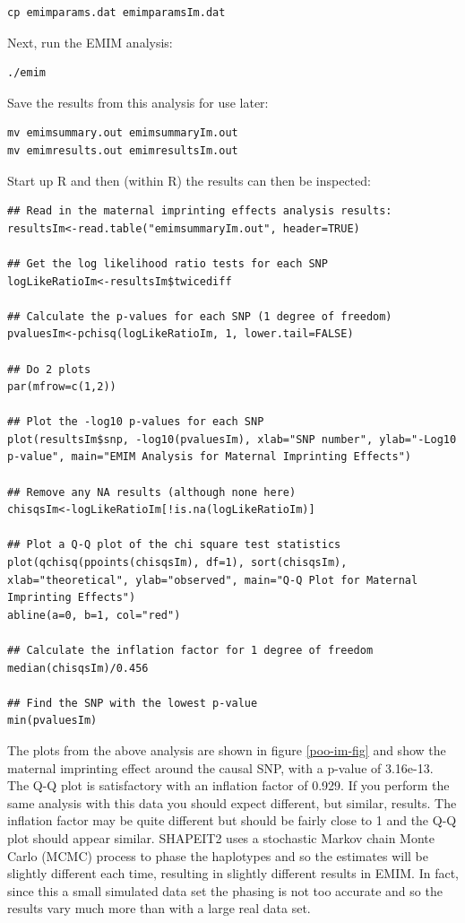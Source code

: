 \documentclass[a4paper,12pt]{article}
\begin{document}
\vspace{0.35cm} \begin{lstlisting}
cp emimparams.dat emimparamsIm.dat 
\end{lstlisting} \vspace{0.35cm}
Next, run the EMIM analysis: 
\vspace{0.35cm} \begin{lstlisting}
./emim 
\end{lstlisting} \vspace{0.35cm}
Save the results from this analysis for use later: 
\vspace{0.35cm} \begin{lstlisting}
mv emimsummary.out emimsummaryIm.out
mv emimresults.out emimresultsIm.out

\end{lstlisting} \vspace{0.35cm}
Start up R and then (within R) the results can then be inspected: 
\vspace{0.35cm} \begin{lstlisting}
## Read in the maternal imprinting effects analysis results:
resultsIm<-read.table("emimsummaryIm.out", header=TRUE)

## Get the log likelihood ratio tests for each SNP
logLikeRatioIm<-resultsIm$twicediff

## Calculate the p-values for each SNP (1 degree of freedom)
pvaluesIm<-pchisq(logLikeRatioIm, 1, lower.tail=FALSE)

## Do 2 plots
par(mfrow=c(1,2))

## Plot the -log10 p-values for each SNP
plot(resultsIm$snp, -log10(pvaluesIm), xlab="SNP number", ylab="-Log10 p-value", main="EMIM Analysis for Maternal Imprinting Effects")

## Remove any NA results (although none here)
chisqsIm<-logLikeRatioIm[!is.na(logLikeRatioIm)]

## Plot a Q-Q plot of the chi square test statistics
plot(qchisq(ppoints(chisqsIm), df=1), sort(chisqsIm), xlab="theoretical", ylab="observed", main="Q-Q Plot for Maternal Imprinting Effects")
abline(a=0, b=1, col="red")
     
## Calculate the inflation factor for 1 degree of freedom
median(chisqsIm)/0.456

## Find the SNP with the lowest p-value
min(pvaluesIm)

\end{lstlisting} \vspace{0.35cm}
The plots from the above analysis are shown in figure  \ref{poo-im-fig} and show the maternal imprinting effect around the causal SNP, with a p-value of 3.16e-13. The Q-Q plot is satisfactory with an inflation factor of 0.929. If you perform the same analysis with this data you should expect different, but similar, results. The inflation factor may be quite different but should be fairly close to 1 and the Q-Q plot should appear similar. SHAPEIT2 uses a stochastic Markov chain Monte Carlo (MCMC) process to phase the haplotypes and so the estimates will be slightly different each time, resulting in slightly different results in EMIM. In fact, since this a small simulated data set the phasing is not too accurate and so the results vary much more than with a large real data set. 
\end{document}
